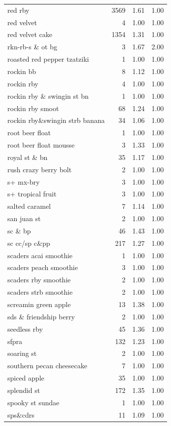 \begin{table}
\begin{tabular}{lrrr}
red rby & 3569 & 1.61 & 1.00 \\
red velvet & 4 & 1.00 & 1.00 \\
red velvet cake & 1354 & 1.31 & 1.00 \\
rkn-rb-s \& ot bg & 3 & 1.67 & 2.00 \\
roasted red pepper tzatziki & 1 & 1.00 & 1.00 \\
rockin bb & 8 & 1.12 & 1.00 \\
rockin rby & 4 & 1.00 & 1.00 \\
rockin rby \& swingin st bn & 1 & 1.00 & 1.00 \\
rockin rby smoot & 68 & 1.24 & 1.00 \\
rockin rby\&swingin strb banana & 34 & 1.06 & 1.00 \\
root beer float & 1 & 1.00 & 1.00 \\
root beer float mousse & 3 & 1.33 & 1.00 \\
royal st \& bn & 35 & 1.17 & 1.00 \\
rush crazy berry bolt & 2 & 1.00 & 1.00 \\
s+ mx-bry & 3 & 1.00 & 1.00 \\
s+ tropical fruit & 3 & 1.00 & 1.00 \\
salted caramel & 7 & 1.14 & 1.00 \\
san juan st & 2 & 1.00 & 1.00 \\
sc \& bp & 46 & 1.43 & 1.00 \\
sc cc/sp c\&pp & 217 & 1.27 & 1.00 \\
scaders acai smoothie & 1 & 1.00 & 1.00 \\
scaders peach smoothie & 3 & 1.00 & 1.00 \\
scaders rby smoothie & 2 & 1.00 & 1.00 \\
scaders strb smoothie & 2 & 1.00 & 1.00 \\
screamin green apple & 13 & 1.38 & 1.00 \\
sds \& friendship berry & 2 & 1.00 & 1.00 \\
seedless rby & 45 & 1.36 & 1.00 \\
sfpra & 132 & 1.23 & 1.00 \\
soaring st & 2 & 1.00 & 1.00 \\
southern pecan cheesecake & 7 & 1.00 & 1.00 \\
spiced apple & 35 & 1.00 & 1.00 \\
splendid st & 172 & 1.35 & 1.00 \\
spooky st sundae & 1 & 1.00 & 1.00 \\
sps\&cdrs & 11 & 1.09 & 1.00 \\

\end{tabular}
\end{table}

